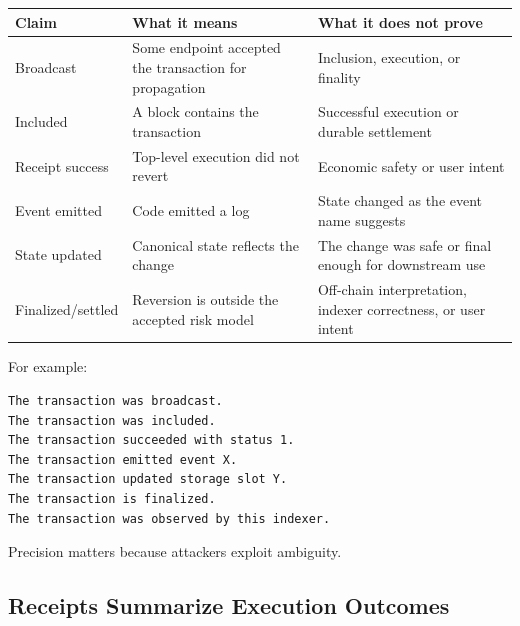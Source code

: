 {\def\LTcaptype{none} %
\begin{longtable}[]{@{}
  >{\raggedright\arraybackslash}p{}
  >{\raggedright\arraybackslash}p{}
  >{\raggedright\arraybackslash}p{}@{}}
\toprule\noalign{}
\begin{minipage}[b]{\linewidth}\raggedright
Claim
\end{minipage} & \begin{minipage}[b]{\linewidth}\raggedright
What it means
\end{minipage} & \begin{minipage}[b]{\linewidth}\raggedright
What it does not prove
\end{minipage} \\
\midrule\noalign{}
\endhead
\bottomrule\noalign{}
\endlastfoot
Broadcast & Some endpoint accepted the transaction for propagation &
Inclusion, execution, or finality \\
Included & A block contains the transaction & Successful execution or
durable settlement \\
Receipt success & Top-level execution did not revert & Economic safety
or user intent \\
Event emitted & Code emitted a log & State changed as the event name
suggests \\
State updated & Canonical state reflects the change & The change was
safe or final enough for downstream use \\
Finalized/settled & Reversion is outside the accepted risk model &
Off-chain interpretation, indexer correctness, or user intent \\
\end{longtable}
}

For example:

\begin{lstlisting}
The transaction was broadcast.
The transaction was included.
The transaction succeeded with status 1.
The transaction emitted event X.
The transaction updated storage slot Y.
The transaction is finalized.
The transaction was observed by this indexer.
\end{lstlisting}

Precision matters because attackers exploit ambiguity.

\subsection{Receipts Summarize Execution Outcomes}


